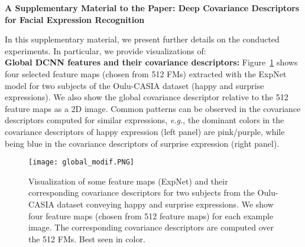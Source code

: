 \documentclass{bmvc2k}
\def\eg{\emph{e.g}\bmvaOneDot}
\def\Eg{\emph{E.g}\bmvaOneDot}
\def\etal{\emph{et al}\bmvaOneDot}
\begin{document}
\newpage
%













\begin{center}{\Large \textbf{A Supplementary Material to the Paper: Deep Covariance Descriptors for Facial Expression Recognition\\}}
\end{center}
In this supplementary material, we present further details on the conducted experiments. 
In particular, we provide visualizations of: \\


 \textbf{Global DCNN features and their covariance descriptors:} 
 Figure~\ref{fig:feature-maps} shows four selected feature maps (chosen from 512 FMs) extracted with the ExpNet model for two subjects of the Oulu-CASIA dataset (happy and surprise expressions). We also show the global covariance descriptor relative to the 512 feature maps as a 2D image. Common patterns can be observed in the covariance descriptors computed for similar expressions, \emph{e.g.}, the dominant colors in the covariance descriptors of happy expression (left panel) are pink/purple, while being blue in the covariance descriptors of surprise expression (right panel). 

\begin{figure}[!ht]
\centering
\texttt{[image: global\_modif.PNG]}
\caption{Visualization of some feature maps (ExpNet) and their corresponding covariance descriptors for two subjects from the Oulu-CASIA dataset conveying happy and surprise expressions. We show four feature maps (chosen from 512 feature maps) for each example image. The corresponding covariance descriptors are computed over the 512 FMs. Best seen in color.}
\label{fig:feature-maps}
\end{figure}
\end{document}

